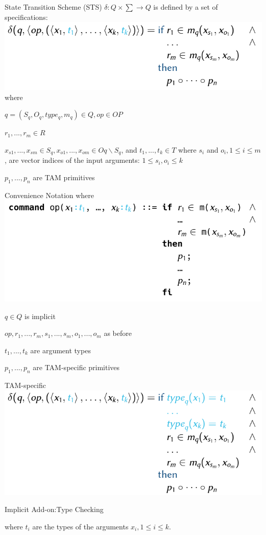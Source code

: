 \documentclass[a4paper]{article}
\begin{document}
\begin{multicols}{3}
    State Transition Scheme (STS)
    $\delta:Q\times\sum\rightarrow Q$ is defined by a set of specifications:
    \includegraphics[width=\linewidth]{Assets/Systemsicherheit-tam-sts.png}
    where
    \begin{itemize*}
        \item $q= (S_q,O_q,type_q,m_q)\in Q,op\in OP$
        \item $r_1,...,r_m\in R$
        \item $x_{s1},...,x_{sm}\in S_q,x_{o1},...,x_{om}\in Oq\backslash S_q$, and $t_1,...,t_k\in T$ where $s_i$ and $o_i, 1\leq i\leq m$ , are vector indices of the input arguments: $1\leq s_i,o_i\leq k$
        \item $p_1,...,p_n$ are TAM primitives
    \end{itemize*}

    Convenience Notation where
    \includegraphics[width=.5\linewidth]{Assets/Systemsicherheit-tam-sts-convenience.png}
    \begin{itemize*}
        \item $q\in Q$ is implicit
        \item $op,r_1 ,...,r_m,s_1 ,...,s_m,o_1 ,...,o_m$ as before
        \item $t_1 ,...,t_k$ are argument types
        \item $p_1 ,...,p_n$ are TAM-specific primitives
    \end{itemize*}

    TAM-specific
    \includegraphics[width=.5\linewidth]{Assets/Systemsicherheit-tam-sts-specific.png}
    \begin{itemize*}
        \item Implicit Add-on:Type Checking
        \item where $t_i$ are the types of the arguments $x_i, 1\leq i\leq k$.
    \end{itemize*}


\end{multicols}
\end{document}
